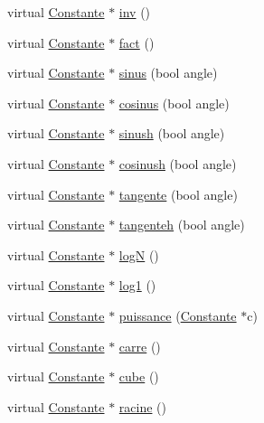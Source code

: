 \begin{DoxyCompactItemize}
\item 
virtual \hyperlink{class_constante}{\-Constante} $\ast$ \hyperlink{class_rationnel_a45dd892e3366ff9be810fde32739b899}{inv} ()
\item 
virtual \hyperlink{class_constante}{\-Constante} $\ast$ \hyperlink{class_rationnel_a68ab5e97a92bb2a08d667861eb920052}{fact} ()
\item 
virtual \hyperlink{class_constante}{\-Constante} $\ast$ \hyperlink{class_rationnel_a5845bc3ef6eff4f427668fd3892e0f5f}{sinus} (bool angle)
\item 
virtual \hyperlink{class_constante}{\-Constante} $\ast$ \hyperlink{class_rationnel_a2740232bc9f557bc4a896e2347312dc8}{cosinus} (bool angle)
\item 
virtual \hyperlink{class_constante}{\-Constante} $\ast$ \hyperlink{class_rationnel_a48c54830a508d28a80d4b2be6762c9ae}{sinush} (bool angle)
\item 
virtual \hyperlink{class_constante}{\-Constante} $\ast$ \hyperlink{class_rationnel_af52bac0dacd387a802b08fa09e899e22}{cosinush} (bool angle)
\item 
virtual \hyperlink{class_constante}{\-Constante} $\ast$ \hyperlink{class_rationnel_af8e760a8cca5eea97ae2f7446074eb89}{tangente} (bool angle)
\item 
virtual \hyperlink{class_constante}{\-Constante} $\ast$ \hyperlink{class_rationnel_ac6f49836dd9d00e79965d247a4d9daee}{tangenteh} (bool angle)
\item 
virtual \hyperlink{class_constante}{\-Constante} $\ast$ \hyperlink{class_rationnel_a5d671bc8d584725f11a130b91332400e}{log\-N} ()
\item 
virtual \hyperlink{class_constante}{\-Constante} $\ast$ \hyperlink{class_rationnel_a93eea5c6c08ad840340743182231454f}{log1} ()
\item 
virtual \hyperlink{class_constante}{\-Constante} $\ast$ \hyperlink{class_rationnel_af437497d370b037d563a96fd6184b37f}{puissance} (\hyperlink{class_constante}{\-Constante} $\ast$c)
\item 
virtual \hyperlink{class_constante}{\-Constante} $\ast$ \hyperlink{class_rationnel_aa191437241e88bb3a6f8953822489ac0}{carre} ()
\item 
virtual \hyperlink{class_constante}{\-Constante} $\ast$ \hyperlink{class_rationnel_a48edd766bd572445e3bc31926e6c24e1}{cube} ()
\item 
virtual \hyperlink{class_constante}{\-Constante} $\ast$ \hyperlink{class_rationnel_a3be00da71666a64e42dcf3737c5c153a}{racine} ()
\end{DoxyCompactItemize}


